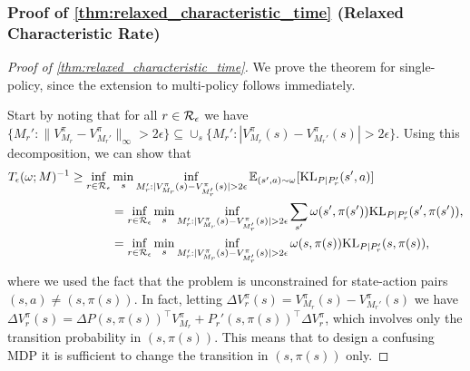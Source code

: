 \subsubsection{Proof of \cref{thm:relaxed_characteristic_time} (Relaxed Characteristic Rate)}
\label{app:thm:relaxed_characteristic_time}
\begin{proof}[Proof of \cref{thm:relaxed_characteristic_time}]
We prove the theorem for single-policy, since the extension to multi-policy follows immediately.

 Start by noting that for all $r\in {\cal R}_\epsilon$ we have $\{M_r':  \|V_{M_r}^\pi - V_{M_r'}^\pi\|_\infty > 2\epsilon \}\subseteq \cup_s \{M_r':  |V_{M_r}^\pi(s) - V_{M_r'}^\pi(s)| > 2\epsilon \} $. Using this decomposition, we can show  that
\begin{align*}
  T_\epsilon(\omega;M)^{-1}
  \geq \inf_{r\in {\cal R}_\epsilon} &\min_s \inf_{M_r': |V_{M_r}^\pi(s) - V_{M_r'}^\pi(s)| > 2\epsilon}\mathbb{E}_{(s',a)\sim \omega}[{\rm KL}_{P|P_r'}(s',a)]\\
  &=   \inf_{r\in {\cal R}_\epsilon} \min_s \inf_{M_r': |V_{M_r}^\pi(s) - V_{M_r'}^\pi(s)| > 2\epsilon} \sum_{s'} \omega(s',\pi(s')) {\rm KL}_{P|P_r'}(s',\pi(s')),\\
  &=   \inf_{r\in {\cal R}_\epsilon} \min_s \inf_{M_r': |V_{M_r}^\pi(s) - V_{M_r'}^\pi(s)| > 2\epsilon}\omega(s,\pi(s)) {\rm KL}_{P|P_r'}(s,\pi(s)),
\end{align*}
where we used the fact that the problem is unconstrained for state-action pairs $(s,a)\neq (s,\pi(s))$. In fact, letting $\Delta V_r^\pi(s)=V_{M_r}^\pi(s) - V_{M_r'}^\pi(s)$ we have $\Delta V_r^\pi(s)=\Delta P(s,\pi(s))^\top V_{M_r}^\pi+P_{r}'(s,\pi(s))^\top \Delta V_{r}^\pi$, which involves only  the transition probability in $(s,\pi(s))$. This means that to design a confusing MDP it is sufficient to change the transition in $(s,\pi(s))$ only.



\end{proof}
